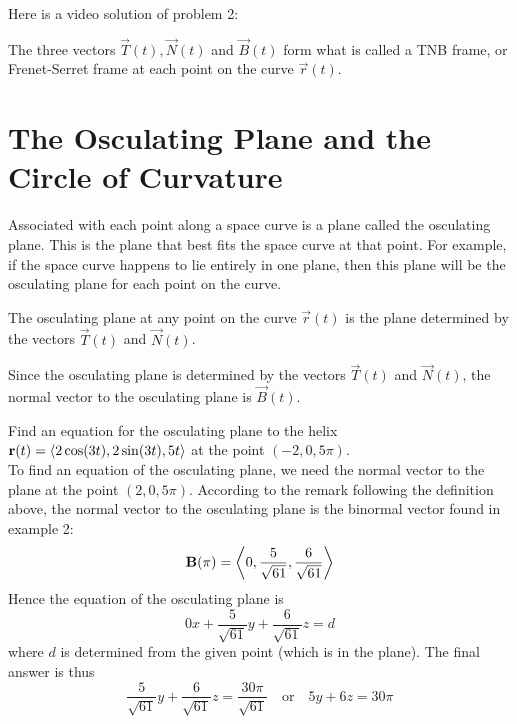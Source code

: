 \documentclass[handout]{ximera}
\begin{document}
Here is a video solution of problem 2:\\
\begin{foldable}
\end{foldable}


The three vectors $\vec T(t), \vec N(t)$ and $\vec B(t)$ form what is called a TNB frame, 
or Frenet-Serret frame at each point on the curve $\vec r(t)$.

\begin{center}
\end{center}




\section{The Osculating Plane and the Circle of Curvature}

Associated with each point along a space curve is a plane called the osculating plane.  This is the plane that best fits the space curve at that point.
For example, if the space curve happens to lie entirely in one plane, then this plane will be the osculating plane for each point on the curve.

\begin{definition}
The osculating plane at any point on the curve $\vec r(t)$ is the plane determined by the vectors $\vec T(t)$ and $\vec N(t)$.
\end{definition}

\begin{remark}
Since the osculating plane is determined by the vectors $\vec T(t)$ and $\vec N(t)$, the normal vector to the osculating plane is $\vec B(t)$.
\end{remark}

\begin{example}[Example 3]
Find an equation for the osculating plane to the helix $\mathbf r(t) =  \left\langle 2\cos(3t), 2\sin(3t), 5t\right\rangle$ at the point $(-2, 0, 5\pi)$.\\
To find an equation of the osculating plane, we need the normal vector to the plane at the point $(2, 0, 5\pi)$.
According to the remark following the definition above, the normal vector to the osculating plane is the binormal vector found in example 2:
\[
\mathbf B(\pi) =   \left\langle 0, \frac{5}{\sqrt {61}}, \frac{6}{\sqrt{61}}\right\rangle
\]
Hence the equation of the osculating plane is
\[
0x + \frac{5}{\sqrt {61}}y +\frac{6}{\sqrt{61}}z = d
\]
where $d$ is determined from the given point (which is in the plane).
The final answer is thus
\[
\frac{5}{\sqrt {61}}y +\frac{6}{\sqrt{61}}z = \frac{30\pi}{\sqrt{61}} \quad \text{or} \quad 5y+6z = 30\pi
\]
\end{example}
\end{document}
